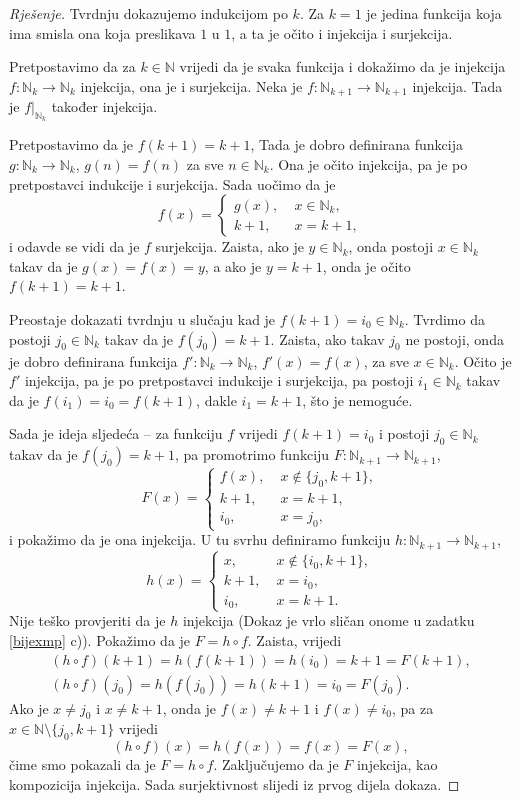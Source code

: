 \begin{proof}[Rješenje]
Tvrdnju dokazujemo indukcijom po $k$. Za $k=1$ je jedina funkcija koja ima smisla ona koja preslikava $1$ u $1$, a ta je očito i injekcija i surjekcija.

Pretpostavimo da za $k\in \mathbb{N}$ vrijedi da je svaka funkcija  i dokažimo da je injekcija $f : \mathbb{N}_k\to \mathbb{N}_k$ injekcija, ona je i surjekcija. Neka je $f : \mathbb{N}_{k+1}\to \mathbb{N}_{k+1}$ injekcija. Tada je $f|_{\mathbb{N}_k}$ također injekcija. 

Pretpostavimo da je $f(k+1)=k+1$, Tada je dobro definirana funkcija $g : \mathbb{N}_k\to \mathbb{N}_k$, $g(n)=f(n)$ za sve $n\in \mathbb{N}_k$. Ona je očito injekcija, pa je po pretpostavci indukcije i surjekcija. Sada uočimo da je
$$f(x)=\begin{cases}
g(x), &\;x\in \mathbb{N}_k,\\
k+1, &\; x=k+1,
\end{cases}$$
i odavde se vidi da je $f$ surjekcija. Zaista, ako je $y\in \mathbb {N}_k$, onda postoji $x\in \mathbb{N}_k$ takav da je $g(x)=f(x)=y$, a ako je $y=k+1$, onda je očito $f(k+1)=k+1$.

Preostaje dokazati tvrdnju u slučaju kad je $f(k+1)=i_0\in \mathbb{N}_k$. Tvrdimo da postoji $j_0\in \mathbb{N}_k$ takav da je $f(j_0)=k+1$. Zaista, ako takav $j_0$ ne postoji, onda je dobro definirana funkcija $f' : \mathbb{N}_k\to \mathbb{N}_k$, $f'(x)=f(x)$, za sve $x\in \mathbb{N}_k$. Očito je $f'$ injekcija, pa je po pretpostavci indukcije i surjekcija, pa postoji $i_1\in \mathbb{N}_k$ takav da je $f(i_1)=i_0=f(k+1)$, dakle $i_1=k+1$, što je nemoguće.

Sada je ideja sljedeća -- za funkciju $f$ vrijedi $f(k+1)=i_0$ i postoji $j_0\in \mathbb{N}_k$ takav da je $f(j_0)=k+1$, pa promotrimo funkciju $F : \mathbb{N}_{k+1}\to \mathbb{N}_{k+1}$,
$$F(x)=\begin{cases}
f(x), &\;x\notin\{j_0, k+1\},\\
k+1, &\; x=k+1,\\
i_0, &\; x=j_0,
\end{cases}$$
i pokažimo da je ona injekcija. U tu svrhu definiramo funkciju $h : \mathbb{N}_{k+1}\to \mathbb{N}_{k+1}$,
$$h(x)=\begin{cases}
x, &\;x\notin\{i_0, k+1\},\\
k+1, &\; x=i_0,\\
i_0, &\; x=k+1.
\end{cases}$$
Nije teško provjeriti da je $h$ injekcija (Dokaz je vrlo sličan onome u zadatku \ref{bijexmp} c)). Pokažimo da je $F=h\circ f$. Zaista, vrijedi 
\begin{gather*}
(h\circ f)(k+1)=h\left(f(k+1)\right)=h(i_0)=k+1=F(k+1),\\
(h\circ f)(j_0)=h\left(f(j_0)\right)=h(k+1)=i_0=F(j_0).
\end{gather*}
Ako je $x\neq j_0$ i $x\neq k+1$, onda je $f(x)\neq k+1$ i $f(x)\neq i_0$, pa za $x\in \mathbb{N}\setminus\{j_0, k+1\}$ vrijedi $$(h\circ f)(x)=h\left(f(x)\right)=f(x)=F(x),$$
čime smo pokazali da je $F=h\circ f$. Zaključujemo da je $F$ injekcija, kao kompozicija injekcija. Sada surjektivnost slijedi iz prvog dijela dokaza.
\end{proof}
